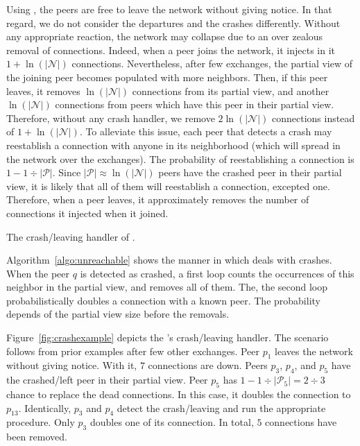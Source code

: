 Using \SPRAY, the peers are free to leave the network without giving
notice. In that regard, we do not consider the departures and the crashes
differently.  Without any appropriate reaction, the network may collapse due to
an over zealous removal of connections. Indeed, when a peer joins the network,
it injects in it $1+\ln(|\mathcal{N}|)$ connections. Nevertheless, after few
exchanges, the partial view of the joining peer becomes populated with more
neighbors. Then, if this peer leaves, it removes $\ln(|\mathcal{N}|)$
connections from its partial view, and another $\ln(|\mathcal{N}|)$ connections
from peers which have this peer in their partial view. Therefore, without any
crash handler, we remove $2\ln(|\mathcal{N}|)$ connections instead of
$1+\ln(|\mathcal{N}|)$. To alleviate this issue, each peer that detects a crash
may reestablish a connection with anyone in its neighborhood (which will spread
in the network over the exchanges). The probability of reestablishing a
connection is $1-{1\div{|\mathcal{P}|}}$. Since
${|\mathcal{P}|}\approx \ln(|\mathcal{N}|)$ peers have the crashed peer in
their partial view, it is likely that all of them will reestablish a
connection, excepted one. Therefore, when a peer leaves, it approximately
removes the number of connections it injected when it joined.

\begin{algorithm}[h]
  
  \caption{\label{algo:unreachable}The crash/leaving handler of \SPRAY.}
\end{algorithm}

Algorithm~\ref{algo:unreachable} shows the manner in which \SPRAY deals
with crashes. When the peer $q$ is detected as crashed, a first loop counts the
occurrences of this neighbor in the partial view, and removes all of them. The,
the second loop probabilistically doubles a connection with a known peer. The
probability depends of the partial view size before the removals.

Figure~\ref{fig:crashexample} depicts the \SPRAY's crash/leaving
handler. The scenario follows from prior examples after few other
exchanges. Peer $p_1$ leaves the network without giving notice. With
it, $7$ connections are down. Peers $p_3$, $p_4$, and $p_5$ have the
crashed/left peer in their partial view. Peer $p_5$ has
$1-{1\div{|\mathcal{P}_5|}}={2\div{3}}$ chance to replace the dead
connections. In this case, it doubles the connection to
$p_{13}$. Identically, $p_3$ and $p_4$ detect the crash/leaving and
run the appropriate procedure. Only $p_3$ doubles one of its
connection. In total, $5$ connections have been removed.  

